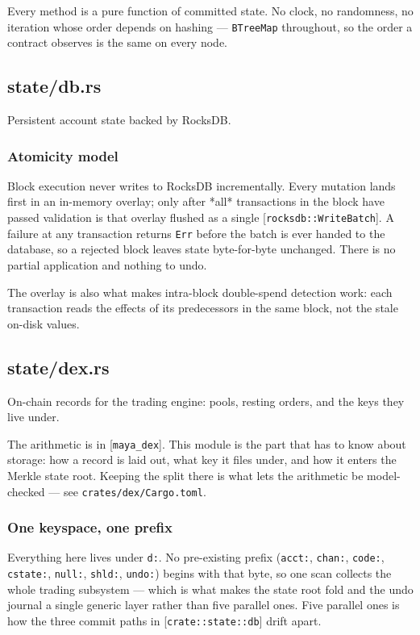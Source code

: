 \documentclass[11pt,a4paper]{article}
\begin{document}
Every method is a pure function of committed state. No clock, no randomness,
no iteration whose order depends on hashing — \texttt{BTreeMap} throughout, so the
order a contract observes is the same on every node.

\subsection{state/db.rs}
Persistent account state backed by RocksDB.

\subsubsection{Atomicity model}

Block execution never writes to RocksDB incrementally. Every mutation lands
first in an in-memory overlay; only after *all* transactions in the block
have passed validation is that overlay flushed as a single
[\texttt{rocksdb::WriteBatch}]. A failure at any transaction returns \texttt{Err} before
the batch is ever handed to the database, so a rejected block leaves state
byte-for-byte unchanged. There is no partial application and nothing to undo.

The overlay is also what makes intra-block double-spend detection work: each
transaction reads the effects of its predecessors in the same block, not the
stale on-disk values.

\subsection{state/dex.rs}
On-chain records for the trading engine: pools, resting orders, and the
keys they live under.

The arithmetic is in [\texttt{maya\_dex}]. This module is the part that has to know
about storage: how a record is laid out, what key it files under, and how it
enters the Merkle state root. Keeping the split there is what lets the
arithmetic be model-checked — see \texttt{crates/dex/Cargo.toml}.

\subsubsection{One keyspace, one prefix}

Everything here lives under \texttt{d:}. No pre-existing prefix (\texttt{acct:}, \texttt{chan:},
\texttt{code:}, \texttt{cstate:}, \texttt{null:}, \texttt{shld:}, \texttt{undo:}) begins with that byte, so one
scan collects the whole trading subsystem — which is what makes the state
root fold and the undo journal a single generic layer rather than five
parallel ones. Five parallel ones is how the three commit paths in
[\texttt{crate::state::db}] drift apart.
\end{document}
